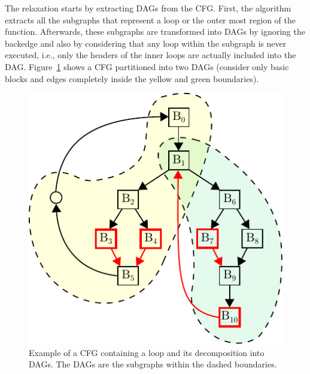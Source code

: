 The relaxation starts by extracting DAGs from the CFG.
First, the algorithm extracts all the subgraphs that represent a loop or the outer most region of the function.
Afterwards, these subgraphs are transformed into DAGs by ignoring the backedge
and also by considering that any loop within the subgraph is never executed,
i.e., only the headers of the inner loops are actually included into the DAG.
Figure~\ref{fig:cfg-relax-example} shows a CFG partitioned into two DAGs (consider
only basic blocks and edges completely inside the yellow and green boundaries).

\begin{figure}[t]
  \centering
  \includegraphics[scale=0.75]{figs/cfg-relax-example.pdf}
  \caption{Example of a CFG containing a loop and its decomposition into DAGs.
           The DAGs are the subgraphs within the dashed boundaries.}
  \label{fig:cfg-relax-example}
\end{figure}


